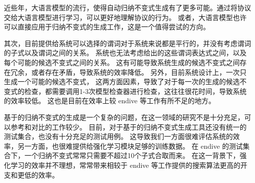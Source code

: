 近些年，大语言模型的流行，使得自动归纳不变式生成有了更多可能。通过将协议交给大语言模型进行学习，可以更好地理解协议的行为。
或者，大语言模型也许可以直接应用于归纳不变式的生成工作，这是一个值得尝试的方向。

其次，目前提供给系统可以选择的谓词对于系统来说都是平行的，并没有考虑谓词的子式以及谓词之间的关系。
系统也无法考虑给出的这些谓词表达式之间，以及每个可能的候选不变式之间的关系。
这有可能导致系统生成的候选不变式之间存在冗余，或者存在矛盾，导致系统的效率降低。
另外，目前系统设计上，一次只生成一个可能的候选不变式，
这两方面因素，导致了对于每一次的生成的候选不变式的检查，都需要调用1-3次模型检查器进行检查，这往往很花时间，导致系统的效率较低。
这也是目前在效率上较 endive 等工作有所不足的地方。

基于\TLA 的归纳不变式的生成是一个复杂的问题，在这一领域的研究不是十分充足，可以参考和对比的工作较少。
目前，对于基于\TLA 的归纳不变式生成工具还没有统一的测试集合，也没有十分充足的测试用例。
这导致我们一方面很难评估系统的效率，另一方面，也很难提供给强化学习模块足够的训练数据。
在 endive 的测试集合下，一个归纳不变式常常只需要不超过10个子式合取而来。
在这一背景下，强化学习的效率并不理想，常常带来相较于 endive 等工作提供的搜索算法更高的开支和更低的效率。

